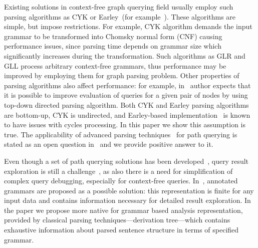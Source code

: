 \documentclass[runningheads,a4paper]{llncs}
\begin{document}

Existing solutions in context-free graph querying field usually employ such parsing algorithms as CYK or Earley~(for example~\cite{ConjCFPathQuery,CFGonRDF,GraphQueryWithEarley}). 
These algorithms are simple, but impose restrictions.
For example, CYK algorithm demands the input grammar to be transformed into Chomsky normal form (CNF) causing performance issues, since parsing time depends on grammar size which significantly increases during the transformation.
Such algorithms as GLR and GLL process arbitrary context-free grammars, thus performance may be improved by employing them for graph parsing problem.
Other properties of parsing algorithms also affect performance: for example, in~\cite{Hellings16} author expects that it is possible to improve evaluation of queries for a given pair of nodes by using top-down directed parsing algorithm.
Both CYK and Earley parsing algorithms are bottom-up, CYK is undirected, and Earley-based implementation~\cite{GraphQueryWithEarley} is known to have issues with cycles processing. 
In this paper we show this assumption is true.
The applicability of advanced parsing techniques~\cite{Grune} for path querying is stated as an open question in~\cite{Hellings16} and we provide positive answer to it.

Even though a set of path querying solutions has been developed~\cite{GraphQueryWithEarley,ConjCFPathQuery,QueryGraphWithData,RegularDBQuery}, query result exploration is still a challenge~\cite{hofman2015separabilityForRegQueryDebugging}, as also there is a need for simplification of complex query debugging, especially for context-free queries.
In~\cite{Hellings16}, annotated grammars are proposed as a possible solution: this representation is finite for any input data and contains information necessary for detailed result exploration.
In the paper we propose more native for grammar based analysis representation, provided by classical parsing techniques---derivation tree---which contains exhaustive information about parsed sentence structure in terms of specified grammar.
\end{document}
